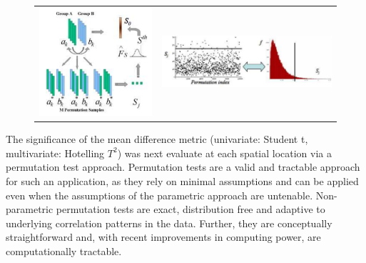 \documentclass{InsightArticle}
\begin{document}
\begin{figure}[htbp]
  \begin{center}
    \begin{tabular}[htbp]{c|c}
      \includegraphics[width=6cm]{IJ_PermTests} &
      \includegraphics[width=9cm]{IJ_PermTests2} 
    \end{tabular}
   \label{fig:TestingPerm}
 \end{center}
\end{figure}

The significance of the mean difference metric (univariate: Student t, multivariate: Hotelling $T^2$) was next evaluate at each spatial location via a permutation test approach. Permutation
tests are a valid and tractable approach for such an application, as they rely on minimal assumptions and can be applied even when the assumptions of the parametric approach are untenable. Non-parametric permutation tests are exact, distribution free and adaptive to underlying correlation patterns in the data. Further, they are conceptually straightforward and, with recent
improvements in computing power, are computationally tractable. 
\end{document}
